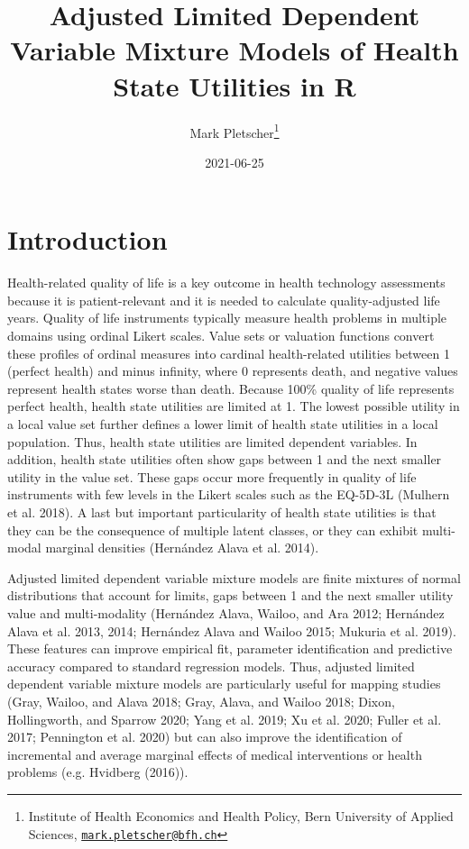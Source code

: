 \documentclass[
]{article}
\title{Adjusted Limited Dependent Variable Mixture Models of Health State Utilities in R}
\author{Mark Pletscher\footnote{Institute of Health Economics and Health Policy, Bern University of Applied Sciences, \href{mailto:mark.pletscher@bfh.ch}{\nolinkurl{mark.pletscher@bfh.ch}}}}
\date{2021-06-25}
\begin{document}
\maketitle

\hypertarget{introduction}{%
\section{Introduction}\label{introduction}}

Health-related quality of life is a key outcome in health technology assessments because it is patient-relevant and it is needed to calculate quality-adjusted life years. Quality of life instruments typically measure health problems in multiple domains using ordinal Likert scales. Value sets or valuation functions convert these profiles of ordinal measures into cardinal health-related utilities between 1 (perfect health) and minus infinity, where 0 represents death, and negative values represent health states worse than death. Because 100\% quality of life represents perfect health, health state utilities are limited at 1. The lowest possible utility in a local value set further defines a lower limit of health state utilities in a local population. Thus, health state utilities are limited dependent variables. In addition, health state utilities often show gaps between 1 and the next smaller utility in the value set. These gaps occur more frequently in quality of life instruments with few levels in the Likert scales such as the EQ-5D-3L (Mulhern et al. 2018). A last but important particularity of health state utilities is that they can be the consequence of multiple latent classes, or they can exhibit multi-modal marginal densities (Hernández Alava et al. 2014).

Adjusted limited dependent variable mixture models are finite mixtures of normal distributions that account for limits, gaps between 1 and the next smaller utility value and multi-modality (Hernández Alava, Wailoo, and Ara 2012; Hernández Alava et al. 2013, 2014; Hernández Alava and Wailoo 2015; Mukuria et al. 2019). These features can improve empirical fit, parameter identification and predictive accuracy compared to standard regression models. Thus, adjusted limited dependent variable mixture models are particularly useful for mapping studies (Gray, Wailoo, and Alava 2018; Gray, Alava, and Wailoo 2018; Dixon, Hollingworth, and Sparrow 2020; Yang et al. 2019; Xu et al. 2020; Fuller et al. 2017; Pennington et al. 2020) but can also improve the identification of incremental and average marginal effects of medical interventions or health problems (e.g. Hvidberg (2016)).
\end{document}
